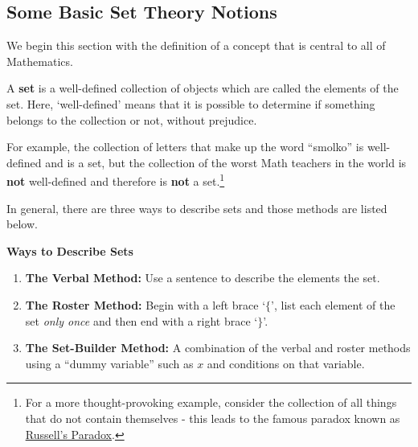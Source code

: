 

\setcounter{footnote}{0}

\label{AppSetTheory}

\subsection{Some Basic Set Theory Notions}
\label{SetTheoryNotions}

We begin this section with the definition of a concept that is central to all of Mathematics.

\medskip

\colorbox{ResultColor}{\bbm

\begin{defn} \label{setdef}

A \textbf{set} is a well-defined collection of objects which are called the elements of the set.  Here, `well-defined' means that it is possible to determine if something belongs to the collection or not, without prejudice. 

\end{defn}

\ebm}

\medskip

For example, the collection of letters that make up the word ``smolko'' is well-defined and is a set, but the collection of the worst Math teachers in the world is \textbf{not} well-defined and therefore is \textbf{not} a set.\footnote{For a more thought-provoking example, consider the collection of all things that do not contain themselves - this leads to the famous paradox known as \href{http://en.wikipedia.org/wiki/Russell's_paradox}{\underline{Russell's Paradox}}.}  

\smallskip

In general, there are three ways to describe sets and those methods are listed below.

\medskip

 \label{waystodescribesets}

\colorbox{ResultColor}{\bbm

\centerline{\textbf{Ways to Describe Sets}}

\begin{enumerate}

\item \textbf{The Verbal Method:} Use a sentence to describe the elements the set.

\item \textbf{The Roster Method:}  Begin with a left brace `$\{$', list each element of the set \textit{only once} and then end with a right brace `$\}$'.

\item \textbf{The Set-Builder Method:} A combination of the verbal and roster methods using a ``dummy variable'' such as $x$ and conditions on that variable.

\end{enumerate}

\ebm}

